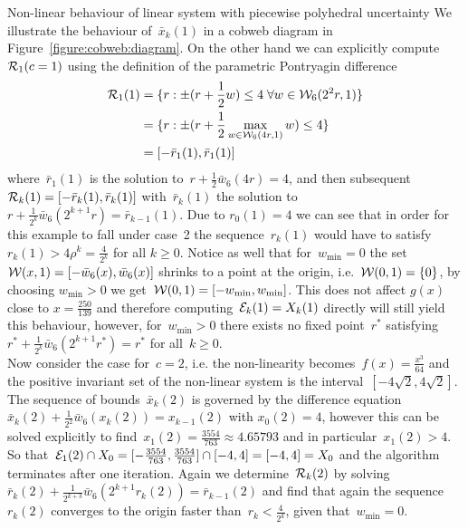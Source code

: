 \begin{example}{Non-linear behaviour of linear system with piecewise polyhedral uncertainty}
%
We illustrate the behaviour of~$\bar x_k(1)$ in a cobweb diagram in Figure~\ref{figure:cobweb:diagram}.
%
On the other hand we can explicitly compute~$\mathcal R_1(c=1)$ using the definition of the parametric Pontryagin difference
%
\[\begin{aligned}
\mathcal R_1(1) &= \{r:\pm(r+\frac{1}{2}w)\leq4\;\forall w\in\mathcal W_6(2^{2}r,1)\}\\
&=\{r:\pm(r+\frac{1}{2}\max_{w\in\mathcal W_6(4r,1)}w)\leq 4\}\\
&= [-\bar r_1(1),\bar r_1(1)]
\end{aligned}\]
%
where~$\bar r_1(1)$ is the solution to~$r+\frac{1}{2}\bar w_6(4r)=4$, and then subsequent~$\mathcal R_{k}(1)=[-\bar r_k(1),\bar r_k(1)]$ with~$\bar r_k(1)$ the solution to~$r+\frac{1}{2^k}\bar w_6(2^{k+1}r)=\bar r_{k-1}(1)$.
%
Due to $r_0(1)=4$ we can see that in order for this example to fall under case~2 the sequence~$r_k(1)$ would have to satisfy~$r_k(1)>4\rho^k=\frac{4}{2^k}$ for all $k\geq0$.
%
Notice as well that for~$w_{\min}=0$ the set~$\mathcal W(x,1)=[-\bar w_6(x),\bar w_6(x)]$ shrinks to a point at the origin, i.e.~$\mathcal W(0,1)=\{0\}$, by choosing $w_{\min}>0$ we get~$\mathcal W(0,1)=[-w_{\min},w_{\min}]$.
%
This does not affect $g(x)$ close to $x=\frac{250}{139}$ and therefore computing~$\mathcal E_k(1)=X_k(1)$ directly will still yield this behaviour, however, for~$w_{\min}>0$ there exists no fixed point~$r^\ast$ satisfying~$r^\ast+\frac{1}{2^k}\bar w_6(2^{k+1}r^\ast)=r^\ast$ for all~$k\geq0$.
%
\\[1em]
%
Now consider the case for~$c=2$, i.e. the non-linearity becomes~$f(x)=\frac{x^3}{64}$ and the positive invariant set of the non-linear system is the interval~$[-4\sqrt{2},4\sqrt{2}]$.
%
The sequence of bounds~$\bar x_k(2)$ is governed by the difference equation~$\bar x_k(2)+\frac{1}{2^2}\bar w_6(x_k(2))=x_{k-1}(2)$ with $x_0(2)=4$, however this can be solved explicitly to find~$x_1(2)=\frac{3554}{763}\approx4.65793$ and in particular~$x_1(2)>4$.
%
So that~$\mathcal E_1(2)\cap X_0=[-\frac{3554}{763},\frac{3554}{763}]\cap[-4,4]=[-4,4]=X_0$ and the algorithm terminates after one iteration.
%
Again we determine~$\mathcal R_k(2)$ by solving~$\bar r_k(2)+\frac{1}{2^{k+3}}\bar w_6(2^{k+1}r_k(2))=\bar r_{k-1}(2)$ and find that again the sequence~$r_k(2)$ converges to the origin faster than~$r_k<\frac{4}{2^k}$, given that~$w_{\min}=0$.


\end{example}
